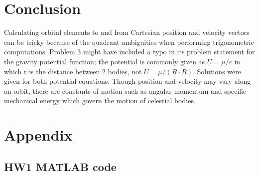 \documentclass[conf]{new-aiaa}
\begin{document}
%
%
%
%

\section{Conclusion} 

Calculating orbital elements to and from Cartesian position and velocity vectors can be tricky because of the quadrant ambiguities when performing trigonometric computations. Problem 3 might have included a typo in its problem statement for the gravity potential function; the potential is commonly given as $U = \mu/r$ in which r is the distance between 2 bodies, not $U = \mu / ( \underline{R} \cdot \underline{R} )$. Solutions were given for both potential equations. Though position and velocity may vary along an orbit, there are constants of motion such as angular momentum and specific mechanical energy which govern the motion of celestial bodies. 




\newpage
\section{Appendix} 

\subsection{HW1 MATLAB code} 
\end{document}
